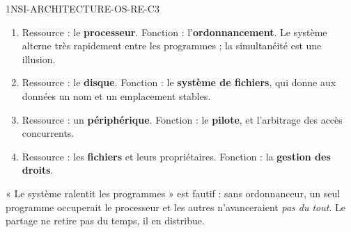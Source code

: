 \begin{corrige}{1NSI-ARCHITECTURE-OS-RE-C3}
\begin{enumerate}
  \item Ressource : le \textbf{processeur}. Fonction : l'\textbf{ordonnancement}. Le système
        alterne très rapidement entre les programmes ; la simultanéité est une illusion.
  \item Ressource : le \textbf{disque}. Fonction : le \textbf{système de fichiers}, qui donne
        aux données un nom et un emplacement stables.
  \item Ressource : un \textbf{périphérique}. Fonction : le \textbf{pilote}, et l'arbitrage des
        accès concurrents.
  \item Ressource : les \textbf{fichiers} et leurs propriétaires. Fonction : la \textbf{gestion
        des droits}.
\end{enumerate}
« Le système ralentit les programmes » est fautif : sans ordonnanceur, un seul programme
occuperait le processeur et les autres n'avanceraient \emph{pas du tout}. Le partage ne retire
pas du temps, il en distribue.
\end{corrige}
